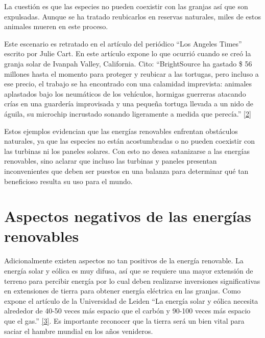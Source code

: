 \documentclass[12pt,spanish,Letterpaper,openany]{book}
\newcommand{\spacesixmilis}{\vspace{6mm}}
\begin{document}


\hypertarget{articulo06_cross02}{}

La cuestión es que las especies no pueden coexistir con las granjas así que son expulsadas. Aunque se ha tratado reubicarlos en reservas naturales, miles de estos animales mueren en este proceso.

Este escenario es retratado en el artículo del periódico ``Los Angeles Times'' escrito por Julie Cart. En este artículo expone lo que ocurrió cuando se creó la granja solar de Ivanpah Valley, California. Cito: ``BrightSource ha gastado \$ 56 millones hasta el momento para proteger y reubicar a las tortugas, pero incluso a ese precio, el trabajo se ha encontrado con una calamidad imprevista: animales aplastados bajo los neumáticos de los vehículos, hormigas guerreras atacando crías en una guardería improvisada y una pequeña tortuga llevada a un nido de águila, su microchip incrustado sonando ligeramente a medida que perecía.'' \protect\hyperlink{articulo06_ref02}{{[}2{]}}

Estos ejemplos evidencian que las energías renovables enfrentan obstáculos naturales, ya que las especies no están acostumbradas o no pueden coexistir con las turbinas ni los paneles solares. Con esto no desea satanizarse a las energías renovables, sino aclarar que incluso las turbinas y paneles presentan inconvenientes que deben ser puestos en una balanza para determinar qué tan beneficioso resulta su uso para el mundo.

\hypertarget{aspectos-negativos-de-las-energuxedas-renovables}{%
\section{Aspectos negativos de las energías renovables}\label{aspectos-negativos-de-las-energuxedas-renovables}}

\hypertarget{articulo06_cross03}{}
\spacesixmilis

Adicionalmente existen aspectos no tan positivos de la energía renovable. La energía solar y eólica es muy difusa, así que se requiere una mayor extensión de terreno para percibir energía por lo cual deben realizarse inversiones significativas en extensiones de tierra para obtener energía eléctrica en las granjas. Como expone el artículo de la Universidad de Leiden ``La energía solar y eólica necesita alrededor de 40-50 veces más espacio que el carbón y 90-100 veces más espacio que el gas.'' \protect\hyperlink{articulo06_ref03}{{[}3{]}}. Es importante reconocer que la tierra será un bien vital para saciar el hambre mundial en los años venideros.
\end{document}
